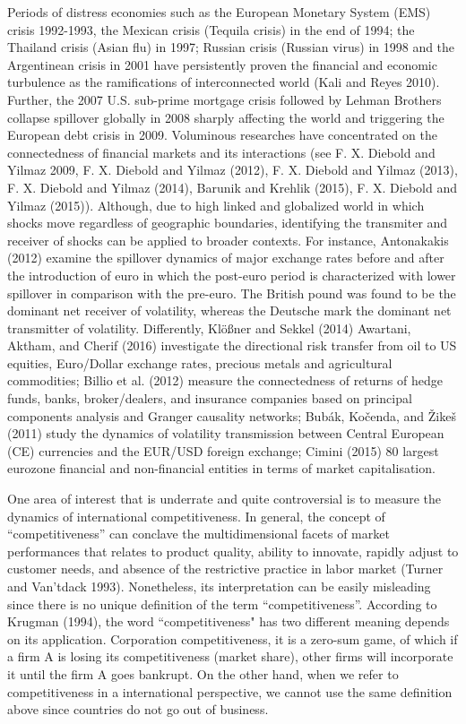 \documentclass[]{elsarticle} %
\begin{document}
Periods of distress economies such as the European Monetary System (EMS)
crisis 1992-1993, the Mexican crisis (Tequila crisis) in the end of
1994; the Thailand crisis (Asian flu) in 1997; Russian crisis (Russian
virus) in 1998 and the Argentinean crisis in 2001 have persistently
proven the financial and economic turbulence as the ramifications of
interconnected world (Kali and Reyes 2010). Further, the 2007 U.S.
sub-prime mortgage crisis followed by Lehman Brothers collapse spillover
globally in 2008 sharply affecting the world and triggering the European
debt crisis in 2009. Voluminous researches have concentrated on the
connectedness of financial markets and its interactions (see F. X.
Diebold and Yilmaz 2009, F. X. Diebold and Yilmaz (2012), F. X. Diebold
and Yilmaz (2013), F. X. Diebold and Yilmaz (2014), Barunik and Krehlik
(2015), F. X. Diebold and Yilmaz (2015)). Although, due to high linked
and globalized world in which shocks move regardless of geographic
boundaries, identifying the transmiter and receiver of shocks can be
applied to broader contexts. For instance, Antonakakis (2012) examine
the spillover dynamics of major exchange rates before and after the
introduction of euro in which the post-euro period is characterized with
lower spillover in comparison with the pre-euro. The British pound was
found to be the dominant net receiver of volatility, whereas the
Deutsche mark the dominant net transmitter of volatility. Differently,
Klößner and Sekkel (2014) Awartani, Aktham, and Cherif (2016)
investigate the directional risk transfer from oil to US equities,
Euro/Dollar exchange rates, precious metals and agricultural
commodities; Billio et al. (2012) measure the connectedness of returns
of hedge funds, banks, broker/dealers, and insurance companies based on
principal components analysis and Granger causality networks; Bubák,
Kočenda, and Žikeš (2011) study the dynamics of volatility transmission
between Central European (CE) currencies and the EUR/USD foreign
exchange; Cimini (2015) 80 largest eurozone financial and non-financial
entities in terms of market capitalisation.

One area of interest that is underrate and quite controversial is to
measure the dynamics of international competitiveness. In general, the
concept of ``competitiveness'' can conclave the multidimensional facets
of market performances that relates to product quality, ability to
innovate, rapidly adjust to customer needs, and absence of the
restrictive practice in labor market (Turner and Van'tdack 1993).
Nonetheless, its interpretation can be easily misleading since there is
no unique definition of the term ``competitiveness''. According to
Krugman (1994), the word ``competitiveness" has two different meaning
depends on its application. Corporation competitiveness, it is a
zero-sum game, of which if a firm A is losing its competitiveness
(market share), other firms will incorporate it until the firm A goes
bankrupt. On the other hand, when we refer to competitiveness in a
international perspective, we cannot use the same definition above since
countries do not go out of business.
\end{document}
